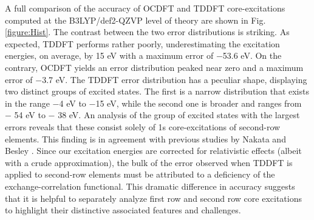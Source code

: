 \documentclass[12pt]{article}
\begin{document}
A full comparison of the accuracy of OCDFT and TDDFT core-excitations computed at the B3LYP/def2-QZVP level of theory are shown in Fig. \ref{figure:Hist}.
The contrast between the two error distributions is striking.  As expected, TDDFT performs rather poorly, underestimating the excitation energies, on average, by 15 eV with a maximum error of $-$53.6 eV. 
On the contrary, OCDFT yields an error distribution peaked near zero and a maximum error of $-$3.7 eV.
The TDDFT error distribution has a peculiar shape, displaying two distinct groups of excited states. The first is a narrow distribution that exists in the range $-$4 eV to $-$15 eV, while the second one is broader and ranges from $-$ 54 eV to $-$ 38 eV. An analysis of the group of excited states with the largest errors reveals that these consist solely of 1s core-excitations of second-row elements. This finding is in agreement with previous studies by Nakata \cite{nakata_extension_2007} and Besley \cite{besley_time-dependent_2009}. Since our excitation energies are corrected for relativistic effects (albeit with a crude approximation), the bulk of the error observed when TDDFT is applied to second-row elements must be attributed to a deficiency of the exchange-correlation functional.\cite{saue_relativistic_2011} This dramatic difference in accuracy suggests that it is helpful to separately analyze first row and second row core excitations to highlight their distinctive associated features and challenges.
\end{document}
